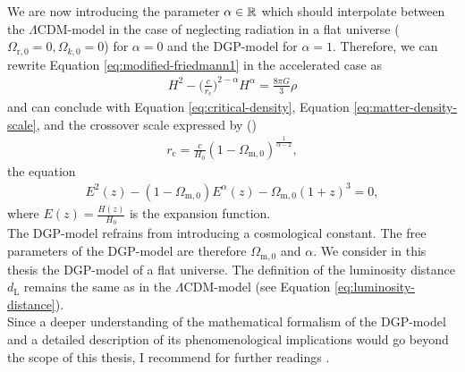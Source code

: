 \noindent We are now introducing the parameter $\alpha \in \mathbb{R}$ which should interpolate between the $\Lambda$CDM-model in the case of neglecting radiation in a flat universe ($\Omega_{\text{r},0} = 0, \Omega_{k,0} = 0$) for $\alpha = 0$ and the DGP-model for $\alpha = 1$. Therefore, we can rewrite Equation \eqref{eq:modified-friedmann1} in the accelerated case as 
\begin{align}
    H^{2} - \biggl(\frac{c}{r_{\text{c}}} \biggr)^{2 - \alpha} H^{\alpha} = \frac{8 \pi G}{3} \rho
\end{align}
and can conclude with Equation \eqref{eq:critical-density}, Equation \eqref{eq:matter-density-scale}, and the crossover scale expressed by (\cite[p.~3]{Dvali2003})
\begin{align}
    r_{\text{c}} = \frac{c}{H_{0}}(1 - \Omega_{\text{m},0})^{\frac{1}{\alpha - 2}}, 
\end{align}
the equation 
\begin{align}
    E^{2}(z) - (1 - \Omega_{\text{m},0}) E^{\alpha}(z) - \Omega_{\text{m},0} (1 + z)^3 = 0, \label{eq:dgp-friedmann-interpolation} 
\end{align}
where $\displaystyle E(z) = \frac{H(z)}{H_{0}}$ is the expansion function. \\

\noindent The DGP-model refrains from introducing a cosmological constant. The free parameters of the DGP-model are therefore $\Omega_{\text{m},0}$ and $\alpha$.
We consider in this thesis the DGP-model of a flat universe. The definition of the luminosity distance $d_{\text{L}}$ remains the same as in the $\Lambda$CDM-model (see Equation \eqref{eq:luminosity-distance}). \\
Since a deeper understanding of the mathematical formalism of the DGP-model and a detailed description of its phenomenological implications would go beyond the scope of this thesis, I recommend for further readings \cite{Lue2006}.
